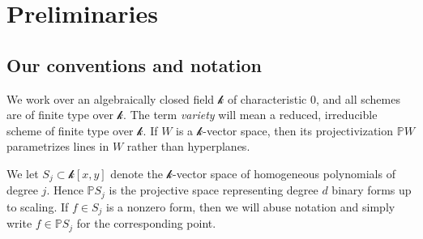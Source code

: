 \documentclass[reqno, 11pt]{amsart}
\theoremstyle{plain}
\newtheorem{theorem}{Theorem}[section]
\theoremstyle{remark}
\renewcommand{\P}{\mathbb{P}}
\renewcommand{\k}{\mathscr{k}}
\DeclareMathOperator{\Gr}{Gr}
\begin{document}
    


\section{Preliminaries} 
\label{section:preliminaries}

    \subsection{Our conventions and notation} We work over an algebraically closed field $\k$ of characteristic $0$, and all schemes are of finite type over $\k$. The term {\sl variety} will mean a reduced, irreducible scheme of finite type over $\k$. If $W$ is a $\k$-vector space, then its projectivization $\P W$ parametrizes lines in $W$ rather than hyperplanes.  
    
    We let $S_j \subset \k[x,y]$ denote the $\k$-vector space of homogeneous polynomials of degree $j$.  Hence $\P S_j$ is the projective space representing degree $d$ binary forms up to scaling.  If $f \in S_j$ is a nonzero form, then we will abuse notation and simply write $f \in \P S_j$ for the corresponding point.  
    
\end{document}

